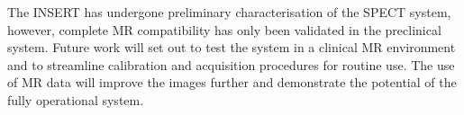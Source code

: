 The \acrshort{INSERT} has undergone preliminary characterisation of the \acrshort{SPECT} system, however, complete \acrshort{MR} compatibility has only been validated in the preclinical system. Future work will set out to test the system in a clinical \acrshort{MR} environment and to streamline calibration and acquisition procedures for routine use. The use of \acrshort{MR} data will improve the images further and demonstrate the potential of the fully operational system.   

